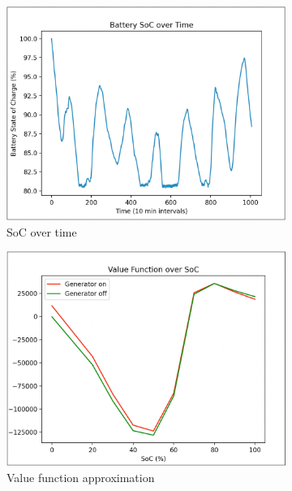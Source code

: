 \documentclass{article}
\begin{document}
\begin{figure}[H]
  \centering
  \begin{subfigure}[b]{0.3\linewidth}
    \includegraphics[width=\linewidth]{pics/linsocvtime.jpg}
    \caption{SoC over time}
  \end{subfigure}
  \begin{subfigure}[b]{0.3\linewidth}
    \includegraphics[width=\linewidth]{pics/linvaluefunc.jpg}
    \caption{Value function approximation}
  \end{subfigure}
  \begin{subfigure}[b]{0.3\linewidth}

\end{subfigure}
\end{figure}
\end{document}
